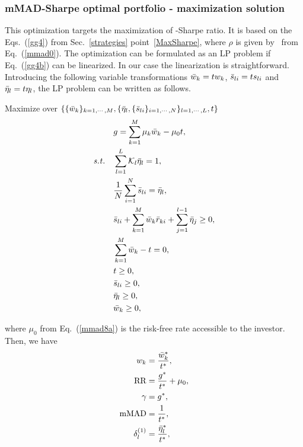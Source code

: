 

\BackToContents

\subsubsection{mMAD-Sharpe optimal portfolio - maximization solution}
This optimization targets the maximization of \mMAD-Sharpe ratio. It is based on the
Eqs.~(\ref{gg4}) from Sec.~\ref{strategies} point~\ref{MaxSharpe}, where $\rho$ is given by \mMAD\ from Eq.~(\ref{mmad0}).
The optimization can be formulated as an LP problem if Eq.~(\ref{gg4b}) can be linearized.
In our case the linearization is straightforward. Introducing the following
variable transformations ${\bar w}_k = t w_k$, ${\bar s}_{li} = t s_{li}$ and ${\bar \eta}_l = t \eta_l$, the LP
problem can be written as follows.

\bigskip
\noindent Maximize over $\{ \{{\bar w}_k\}_{k=1,\cdots,M}, \{ {\bar \eta}_l, \{ {\bar s}_{li} \}_{i=1,\cdots,N} \}_{l=1,\cdots,L}, t \}$
\begin{subequations}\label{mmad8}
\begin{align}
    &g =\sum_{k=1}^M \mu_k \bw_k - \mu_0 t, \label{mmad8a} \\
    \st &\sum_{l=1}^L \cK_l \bbeta_l = 1, \label{mmad8d} \\
        &\frac{1}{N} \sum_{i=1}^N \bs_{li} = \bbeta_l, \label{mmad8b} \\
        &\bs_{li} + \sum_{k=1}^M \bw_k \br_{ki} + \sum_{j=1}^{l-1} \bbeta_j \geq 0, \label{mmad8c} \\
        &\sum_{k=1}^M \bw_k - t = 0, \label{mmad8e} \\
        &t \geq 0, \label{mmad8i} \\
        &\bs_{li} \geq 0, \label{mmad8f} \\
        &\bbeta_l \geq 0, \label{mmad8h} \\
        &\bw_k \geq 0, \label{mmad8g}
\end{align}
\end{subequations}

\noindent where $\mu_0$ from Eq.~(\ref{mmad8a}) is the risk-free rate accessible to the investor.
Then, we have
\begin{subequations}\label{mmad9}
\begin{align}
    w_k &= \frac{\bw_k^*}{t^*} , \label{mmad9a} \\
    \RR &= \frac{g^*}{t^*} + \mu_0, \label{mmad9b} \\
    \Sharpe &= g^*, \label{mmad9c} \\
    \mMAD &= \frac{1}{t^*}, \label{mmad9d} \\
    \delta^{(1)}_l &= \frac{\bbeta_l^*}{t^*}, \label{mmad9e}
\end{align}
\end{subequations}

